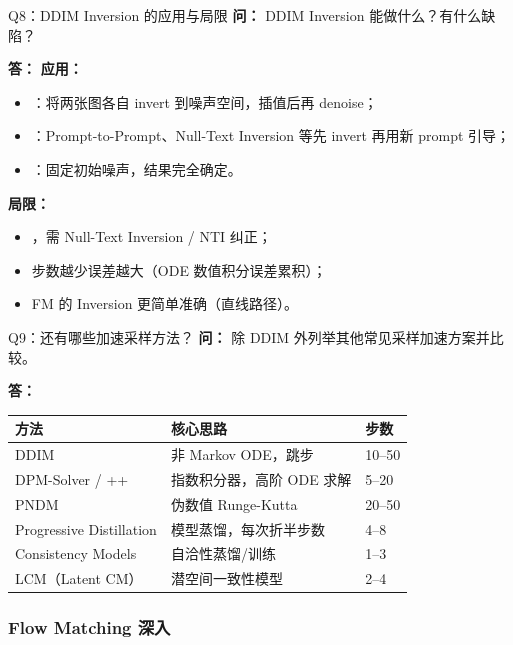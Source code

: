 \begin{conceptbox}{Q8：DDIM Inversion 的应用与局限}
\textbf{问：} DDIM Inversion 能做什么？有什么缺陷？

\textbf{答：}
\textbf{应用：}
\begin{itemize}
  \item {}：将两张图各自 invert 到噪声空间，插值后再 denoise；
  \item {}：Prompt-to-Prompt、Null-Text Inversion 等先 invert 再用新 prompt 引导；
  \item {}：固定初始噪声，结果完全确定。
\end{itemize}
\textbf{局限：}
\begin{itemize}
  \item {}，需 Null-Text Inversion / NTI 纠正；
  \item 步数越少误差越大（ODE 数值积分误差累积）；
  \item FM 的 Inversion 更简单准确（直线路径）。
\end{itemize}
\end{conceptbox}

\begin{conceptbox}{Q9：还有哪些加速采样方法？}
\textbf{问：} 除 DDIM 外列举其他常见采样加速方案并比较。

\textbf{答：}
\begin{center}
\begin{tabular}{lll}
\hline
\textbf{方法} & \textbf{核心思路} & \textbf{步数} \\ \hline
DDIM & 非 Markov ODE，跳步 & 10--50 \\
DPM-Solver / ++ & 指数积分器，高阶 ODE 求解 & 5--20 \\
PNDM & 伪数值 Runge-Kutta & 20--50 \\
Progressive Distillation & 模型蒸馏，每次折半步数 & 4--8 \\
Consistency Models & 自洽性蒸馏/训练 & 1--3 \\
LCM（Latent CM） & 潜空间一致性模型 & 2--4 \\
\hline
\end{tabular}
\end{center}
\end{conceptbox}

\subsubsection{Flow Matching 深入}

